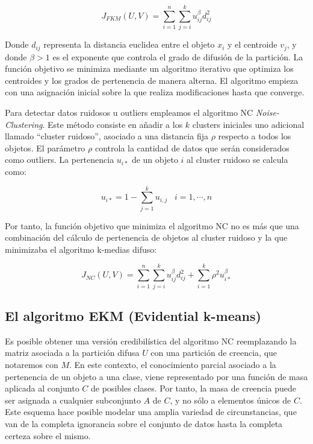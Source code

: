 \begin{equation}
J_{FKM}(U,V) = \sum_{i=1}^{n}\sum_{j=i}^{k} u_{ij}^\beta d_{ij}^2
\label{eqn8}
\end{equation}

Donde $d_{ij}$ representa la distancia euclidea entre el objeto $x_i$ y el centroide $v_j$, y donde $\beta > 1$ es el exponente que controla el grado de difusión de la partición. La función objetivo se minimiza mediante un algoritmo iterativo que optimiza los centroides y los grados de pertenencia de manera alterna. El algoritmo empieza con una asignación inicial sobre la que realiza modificaciones hasta que converge.

Para detectar datos ruidosos u outliers empleamos el algoritmo \acs{NC} \textit{Noise-Clustering}. Este método consiste en añadir a los $k$ clusters iniciales uno adicional llamado ``cluster ruidoso'', asociado a una distancia fija $\rho$ respecto a todos los objetos. El parámetro $\rho$ controla la cantidad de datos que serán considerados como outliers. La pertenencia $u_{i*}$ de un objeto $i$ al cluster ruidoso se calcula como:

\begin{equation}
u_{i*} = 1 - \sum_{j=1}^{k} u_{i,j} \;\;\; i = {1,\cdots,n}
\label{eqn9}
\end{equation}

Por tanto, la función objetivo que minimiza el algoritmo \acs{NC} no es más que una combinación del cálculo de pertenencia de objetos al cluster ruidoso y la que minimizaba el algoritmo k-medias difuso:

\begin{equation}
J_{NC}(U,V) = \sum_{i=1}^{n}\sum_{j=i}^{k} u_{ij}^\beta d_{ij}^2 + \sum_{i=1}^{k} \rho^2 u_{i*}^\beta
\label{eqn10}
\end{equation}

\subsection{El algoritmo EKM (Evidential k-means)}

Es posible obtener una versión credibilística del algoritmo \acs{NC} reemplazando la matriz asociada a la partición difusa $U$ con una partición de creencia, que notaremos con $M$. En este contexto, el conocimiento parcial asociado a la pertenencia de un objeto a una clase, viene representado por una función de masa aplicada al conjunto $C$ de posibles clases. Por tanto, la masa de creencia puede ser asignada a cualquier subconjunto $A$ de $C$, y no sólo a elementos únicos de $C$. Este esquema hace posible modelar una amplia variedad de circunstancias, que van de la completa ignorancia sobre el conjunto de datos hasta la completa certeza sobre el mismo.

